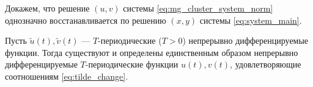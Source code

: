 Докажем, что решение $(u, v)$ системы \eqref{eq:mg_cluster_system_norm} однозначно восстанавливается по решению $(x, y)$ системы \eqref{eq:system_main}.

\begin{lemma}
	\label{lm:uv_from_tilde}
	Пусть $\tilde{u}(t), \tilde{v}(t)$ --- $T$-периодические ($T > 0$) непрерывно дифференцируемые функции. Тогда существуют и определены единственным образом непрерывно дифференцируемые $T$-периодические функции $u(t), v(t)$, удовлетворяющие соотношениям \eqref{eq:tilde_change}.
\end{lemma}
